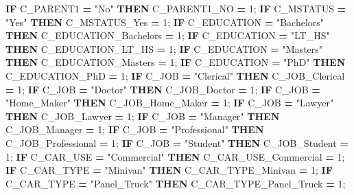 \documentclass[]{article}
\newenvironment{Shaded}{\begin{snugshade}}{\end{snugshade}}
\newcommand{\KeywordTok}[1]{\textcolor[rgb]{0.13,0.29,0.53}{\textbf{{#1}}}}
\newcommand{\DecValTok}[1]{\textcolor[rgb]{0.00,0.00,0.81}{{#1}}}
\newcommand{\StringTok}[1]{\textcolor[rgb]{0.31,0.60,0.02}{{#1}}}
\newcommand{\NormalTok}[1]{{#1}}
\begin{document}
\begin{Shaded}
\begin{Highlighting}[]
{{{{{{{{{{{{{{{{{{{{{{{{{{{{{{{{{{{{{{{{{{{{{{{{{{{{{    \KeywordTok{IF} \NormalTok{C_PARENT1 }\KeywordTok{=} \StringTok{"No"} \KeywordTok{THEN} \NormalTok{C_PARENT1_NO }\KeywordTok{=} \DecValTok{1}\NormalTok{;}
    \KeywordTok{IF} \NormalTok{C_MSTATUS }\KeywordTok{=} \StringTok{"Yes"} \KeywordTok{THEN} \NormalTok{C_MSTATUS_Yes }\KeywordTok{=} \DecValTok{1}\NormalTok{;}
    \KeywordTok{IF} \NormalTok{C_EDUCATION }\KeywordTok{=} \StringTok{"Bachelors"} \KeywordTok{THEN} \NormalTok{C_EDUCATION_Bachelors }\KeywordTok{=} \DecValTok{1}\NormalTok{;}
    \KeywordTok{IF} \NormalTok{C_EDUCATION }\KeywordTok{=} \StringTok{"LT_HS"} \KeywordTok{THEN} \NormalTok{C_EDUCATION_LT_HS }\KeywordTok{=} \DecValTok{1}\NormalTok{;}
    \KeywordTok{IF} \NormalTok{C_EDUCATION }\KeywordTok{=} \StringTok{"Masters"} \KeywordTok{THEN} \NormalTok{C_EDUCATION_Masters }\KeywordTok{=} \DecValTok{1}\NormalTok{;}
    \KeywordTok{IF} \NormalTok{C_EDUCATION }\KeywordTok{=} \StringTok{"PhD"} \KeywordTok{THEN} \NormalTok{C_EDUCATION_PhD }\KeywordTok{=} \DecValTok{1}\NormalTok{;}
    \KeywordTok{IF} \NormalTok{C_JOB }\KeywordTok{=} \StringTok{"Clerical"} \KeywordTok{THEN} \NormalTok{C_JOB_Clerical }\KeywordTok{=} \DecValTok{1}\NormalTok{;}
    \KeywordTok{IF} \NormalTok{C_JOB }\KeywordTok{=} \StringTok{"Doctor"} \KeywordTok{THEN} \NormalTok{C_JOB_Doctor }\KeywordTok{=} \DecValTok{1}\NormalTok{;}
    \KeywordTok{IF} \NormalTok{C_JOB }\KeywordTok{=} \StringTok{"Home_Maker"} \KeywordTok{THEN} \NormalTok{C_JOB_Home_Maker }\KeywordTok{=} \DecValTok{1}\NormalTok{;}
    \KeywordTok{IF} \NormalTok{C_JOB }\KeywordTok{=} \StringTok{"Lawyer"} \KeywordTok{THEN} \NormalTok{C_JOB_Lawyer }\KeywordTok{=} \DecValTok{1}\NormalTok{;}
    \KeywordTok{IF} \NormalTok{C_JOB }\KeywordTok{=} \StringTok{"Manager"} \KeywordTok{THEN} \NormalTok{C_JOB_Manager }\KeywordTok{=} \DecValTok{1}\NormalTok{;}
    \KeywordTok{IF} \NormalTok{C_JOB }\KeywordTok{=} \StringTok{"Professional"} \KeywordTok{THEN} \NormalTok{C_JOB_Professional }\KeywordTok{=} \DecValTok{1}\NormalTok{;}
    \KeywordTok{IF} \NormalTok{C_JOB }\KeywordTok{=} \StringTok{"Student"} \KeywordTok{THEN} \NormalTok{C_JOB_Student }\KeywordTok{=} \DecValTok{1}\NormalTok{;}
    \KeywordTok{IF} \NormalTok{C_CAR_USE }\KeywordTok{=} \StringTok{"Commercial"} \KeywordTok{THEN} \NormalTok{C_CAR_USE_Commercial }\KeywordTok{=} \DecValTok{1}\NormalTok{;}
    \KeywordTok{IF} \NormalTok{C_CAR_TYPE }\KeywordTok{=} \StringTok{"Minivan"} \KeywordTok{THEN} \NormalTok{C_CAR_TYPE_Minivan }\KeywordTok{=} \DecValTok{1}\NormalTok{;}
    \KeywordTok{IF} \NormalTok{C_CAR_TYPE }\KeywordTok{=} \StringTok{"Panel_Truck"} \KeywordTok{THEN} \NormalTok{C_CAR_TYPE_Panel_Truck }\KeywordTok{=} \DecValTok{1}\NormalTok{;}
}}}}}}}}}}}}}}}}}}}}}}}}}}}}}}}}}}}}}}}}}}}}}}}}}}}}}
\end{Highlighting}
\end{Shaded}
\end{document}
